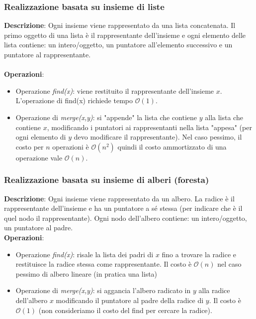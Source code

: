 \documentclass[../cheatSheetAlgoritmi.tex]{subfiles}
\begin{document}
\subsubsection{Realizzazione basata su insieme di liste}
\textbf{Descrizione}: Ogni insieme viene rappresentato da una lista concatenata. Il primo oggetto di una lista è il rappresentante dell'insieme e ogni elemento delle lista contiene: un intero/oggetto, un puntatore all'elemento successivo e un puntatore al rappresentante.\\\\
\textbf{Operazioni}:
\begin{itemize}
	\item Operazione \emph{find(x)}: viene restituito il rappresentante dell'insieme $x$. L'operazione di find(x) richiede tempo $\mathcal{O}(1)$.
	\item Operazione di \emph{merge(x,y)}: si "appende" la lista che contiene $y$ alla lista che contiene $x$, modificando i puntatori ai rappresentanti nella lista "appesa" (per ogni elemento di $y$ devo modificare il rappresentante). Nel caso pessimo, il costo per $n$ operazioni è $\mathcal{O}(n^{2})$ quindi il costo ammortizzato di una operazione vale $\mathcal{O}(n)$. 
\end{itemize}
\subsubsection{Realizzazione basata su insieme di alberi (foresta)}
\textbf{Descrizione}: Ogni insieme viene rappresentato da un albero. La radice è il rappresentante dell'insieme e ha un puntatore a sé stessa (per indicare che è il quel nodo il rappresentante). Ogni nodo dell'albero contiene: un intero/oggetto, un puntatore al padre.\\
\textbf{Operazioni}:
\begin{itemize}
	\item Operazione \emph{find(x)}: risale la lista dei padri di $x$ fino a trovare la radice e restituisce la radice stessa come rappresentante. Il costo è $\mathcal{O}(n)$ nel caso pessimo di albero lineare (in pratica una lista)
	\item Operazione di \emph{merge(x,y)}: si aggancia l'albero radicato in $y$ alla radice dell'albero $x$ modificando il puntatore al padre della radice di $y$. Il costo è $\mathcal{O}(1)$ (non consideriamo il costo del find per cercare la radice).  
\end{itemize}
\end{document}
